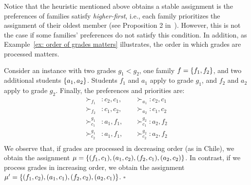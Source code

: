     Notice that the heuristic mentioned above obtains a stable assignment is the preferences of families satisfy \emph{higher-first}, i.e., each family prioritizes the assignment of their oldest member (see Proposition 2 in~\cite{Correa_2022}). However, this is not the case if some families' preferences do not satisfy this condition. In addition, as Example~\ref{ex: order of grades matters} illustrates, the order in which grades are processed matters.
    \begin{example}\label{ex: order of grades matters}
        Consider an instance with two grades \(g_1 < g_2\), one family \(f = \left\{f_1,f_2\right\}\), and two additional students \(\left\{a_1, a_2\right\}\). Students \(f_1\) and \(a_1\) apply to grade \(g_1\),
        and \(f_2\) and \(a_2\) apply to grade \(g_2\). Finally, the preferences and priorities are:
        \begin{equation}
          \begin{aligned}
            \succ_{f_1}&: c_2, c_1, \quad &\succ_{a_1}: c_2, c_1   \\
            \succ_{f_2}&: c_1, c_2, \quad &\succ_{a_2}: c_1, c_2   \\
            \succ_{c_1}^{g_1}&: a_1, f_1, \quad &\succ_{c_1}^{g_2}: a_2, f_2 \\
            \succ_{c_2}^{g_1}&: a_1, f_1, \quad &\succ_{c_2}^{g_2}: a_2, f_2 \\
          \end{aligned}
        \end{equation}
        We observe that, if grades are processed in decreasing order (as in Chile), we obtain the assignment \(\mu = \left\{(f_1, c_1), (a_1, c_2), (f_2, c_1), (a_2, c_2)\right\}\). In contrast, if we process grades in increasing order, we obtain the assignment \(\mu' = \left\{(f_1, c_2), (a_1, c_1), (f_2, c_2), (a_2, c_1)\right\}\).
        \hfill \(\square\)
    \end{example}

